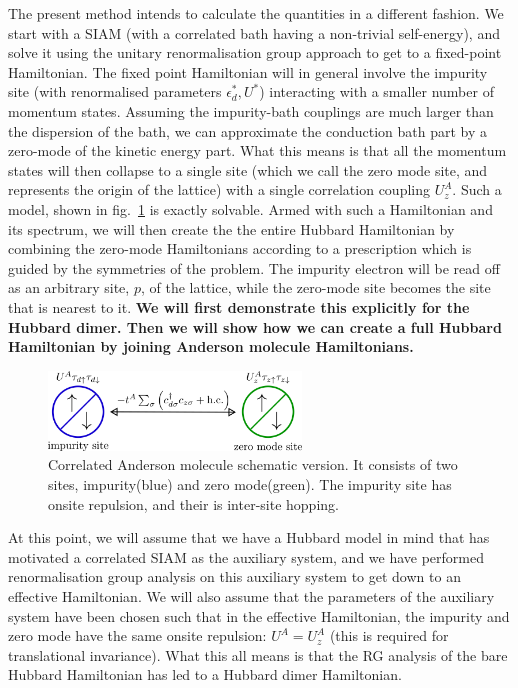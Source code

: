 \documentclass[12pt]{article}
\numberwithin{equation}{section}
\begin{document}
The present method intends to calculate the quantities in a different fashion. We start with a SIAM (with a correlated bath having a non-trivial self-energy), and solve it using the unitary renormalisation group approach to get to a fixed-point Hamiltonian. The fixed point Hamiltonian will in general involve the impurity site (with renormalised parameters $\epsilon_d^*, U^*$) interacting with a smaller number of momentum states. Assuming the impurity-bath couplings are much larger than the dispersion of the bath, we can approximate the conduction bath part by a zero-mode of the kinetic energy part. What this means is that all the momentum states will then collapse to a single site (which we call the zero mode site, and represents the origin of the lattice) with a single correlation coupling $U^A_z$. Such a model, shown in fig.~\ref{and_mol} is exactly solvable. Armed with such a Hamiltonian and its spectrum, we will then create the the entire Hubbard Hamiltonian by combining the zero-mode Hamiltonians according to a prescription which is guided by the symmetries of the problem. The impurity electron will be read off as an arbitrary site, \(p\), of the lattice, while the zero-mode site becomes the site that is nearest to it. 
\textbf{We will first demonstrate this explicitly for the Hubbard dimer. Then we will show how we can create a full Hubbard Hamiltonian by joining Anderson molecule Hamiltonians.}
\begin{figure}[htpb]
	\centering
	\includegraphics[width=0.6\textwidth]{./gen_siam.png}
	\caption{Correlated Anderson molecule schematic version. It consists of two sites, impurity(blue) and zero mode(green). The impurity site has onsite repulsion, and their is inter-site hopping.}
	\label{and_mol}
\end{figure}
At this point, we will assume that we have a Hubbard model in mind that has motivated a correlated SIAM as the auxiliary system, and we have performed renormalisation group analysis on this auxiliary system to get down to an effective Hamiltonian. We will also assume that the parameters of the auxiliary system have been chosen such that in the effective Hamiltonian, the impurity and zero mode have the same onsite repulsion: $U^A = U^A_z$ (this is required for translational invariance). What this all means is that the RG analysis of the bare Hubbard Hamiltonian has led to a Hubbard dimer Hamiltonian.
\end{document}
